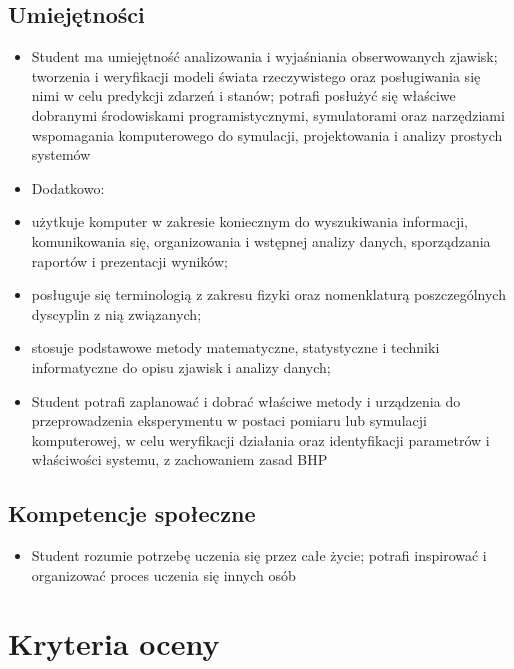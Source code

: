 \documentclass[12pt, a4paper]{article}
\begin{document}
\subsection*{Umiejętności}
\begin{itemize}
  \item Student ma umiejętność analizowania i wyjaśniania obserwowanych zjawisk; tworzenia i weryfikacji modeli świata rzeczywistego oraz posługiwania się nimi w celu predykcji zdarzeń i stanów; potrafi posłużyć się właściwe dobranymi środowiskami programistycznymi, symulatorami oraz narzędziami wspomagania komputerowego do symulacji, projektowania i analizy prostych systemów
  \item Dodatkowo:
  \item użytkuje komputer w zakresie koniecznym do wyszukiwania informacji, komunikowania się, organizowania i wstępnej analizy danych, sporządzania raportów i prezentacji wyników;
  \item posługuje się terminologią z zakresu fizyki oraz nomenklaturą poszczególnych dyscyplin z nią związanych;
  \item stosuje podstawowe metody matematyczne, statystyczne i techniki informatyczne do opisu zjawisk i analizy danych;
  \item Student potrafi zaplanować i dobrać właściwe metody i urządzenia do przeprowadzenia eksperymentu w postaci pomiaru lub symulacji komputerowej, w celu weryfikacji działania oraz identyfikacji parametrów i właściwości systemu, z zachowaniem zasad BHP
\end{itemize}

\subsection*{Kompetencje społeczne}
\begin{itemize}
  \item Student rozumie potrzebę uczenia się przez całe życie; potrafi inspirować i organizować proces uczenia się innych osób
\end{itemize}

\section{Kryteria oceny}
\end{document}
